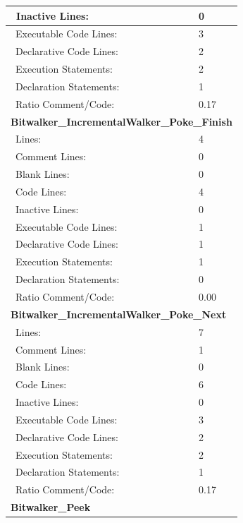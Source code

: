 \begin{longtable}{||p{}|p{}||}
    \\
    \hline
    \ Inactive Lines:  & 0
    \\
    \hline
    \ Executable Code Lines:  & 3
    \\
    \hline
    \ Declarative Code Lines:  & 2
    \\
    \hline
    \ Execution Statements:  & 2
    \\
    \hline
    \ Declaration Statements:  & 1
    \\
    \hline
    \ Ratio Comment/Code:  & 0.17
    \\
    \hline
    \multicolumn{2}{||l||}{\textbf{Bitwalker\_IncrementalWalker\_Poke\_Finish}}
\\\hline
    \ Lines: & 4
    \\
    \hline
    \ Comment Lines: & 0
    \\
    \hline
    \ Blank Lines: & 0
    \\
    \hline
    \ Code Lines:  & 4
    \\
    \hline
    \ Inactive Lines:  & 0
    \\
    \hline
    \ Executable Code Lines:  & 1
    \\
    \hline
    \ Declarative Code Lines:  & 1
    \\
    \hline
    \ Execution Statements:  & 1
    \\
    \hline
    \ Declaration Statements:  & 0
    \\
    \hline
    \ Ratio Comment/Code:  & 0.00
    \\
    \hline
    \multicolumn{2}{||l||}{\textbf{Bitwalker\_IncrementalWalker\_Poke\_Next}}
\\\hline
    \ Lines: & 7
    \\
    \hline
    \ Comment Lines: & 1
    \\
    \hline
    \ Blank Lines: & 0
    \\
    \hline
    \ Code Lines:  & 6
    \\
    \hline
    \ Inactive Lines:  & 0
    \\
    \hline
    \ Executable Code Lines:  & 3
    \\
    \hline
    \ Declarative Code Lines:  & 2
    \\
    \hline
    \ Execution Statements:  & 2
    \\
    \hline
    \ Declaration Statements:  & 1
    \\
    \hline
    \ Ratio Comment/Code:  & 0.17
    \\
    \hline
    \multicolumn{2}{||l||}{\textbf{Bitwalker\_Peek}}

\end{longtable}

